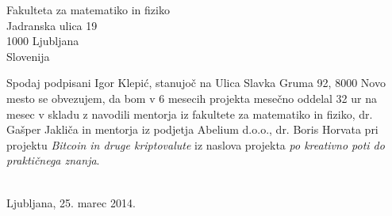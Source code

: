 \documentclass[a4paper]{scrlttr2}
\begin{document}
 
\begin{letter}{Fakulteta za matematiko in fiziko \\ Jadranska ulica 19 \\ 1000 Ljubljana \\ Slovenija}
 

\opening{}
Spodaj podpisani Igor Klepić, stanujoč na Ulica Slavka Gruma 92, 8000 Novo mesto se obvezujem, da bom v 6 mesecih projekta mesečno oddelal 32 ur na mesec v skladu z navodili mentorja iz fakultete za matematiko in fiziko, dr. Gašper Jakliča in mentorja iz podjetja Abelium d.o.o., dr. Boris Horvata pri projektu \textit{Bitcoin in druge kriptovalute} iz naslova projekta \textit{po kreativno poti do praktičnega znanja}.
\\
\\

\closing{Ljubljana, 25. marec 2014.}


 
\end{letter}
 
\end{document}
